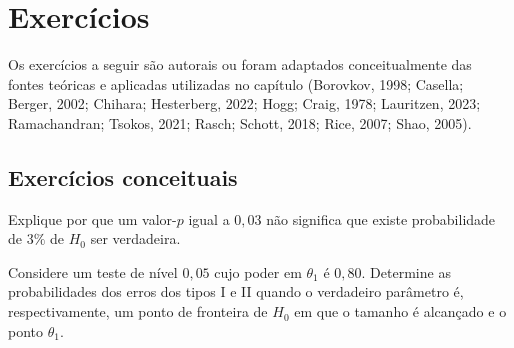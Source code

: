 \documentclass[
  letterpaper,
  DIV=11,
  numbers=noendperiod]{scrreprt}
\begin{document}
\section{Exercícios}\label{exercuxedcios-7}

Os exercícios a seguir são autorais ou foram adaptados conceitualmente
das fontes teóricas e aplicadas utilizadas no capítulo (Borovkov, 1998;
Casella; Berger, 2002; Chihara; Hesterberg, 2022; Hogg; Craig, 1978;
Lauritzen, 2023; Ramachandran; Tsokos, 2021; Rasch; Schott, 2018; Rice,
2007; Shao, 2005).

\subsection{Exercícios conceituais}\label{exercuxedcios-conceituais-1}

\begin{tcolorbox}[enhanced jigsaw, colback=white, leftrule=.75mm, colbacktitle=quarto-callout-note-color!10!white, breakable, titlerule=0mm, bottomtitle=1mm, title=\textcolor{quarto-callout-note-color}{\faInfo}\hspace{0.5em}{Exercício 1}, colframe=quarto-callout-note-color-frame, toprule=.15mm, opacityback=0, bottomrule=.15mm, opacitybacktitle=0.6, arc=.35mm, toptitle=1mm, rightrule=.15mm, coltitle=black, left=2mm]

Explique por que um valor-\(p\) igual a \(0{,}03\) não significa que
existe probabilidade de \(3\%\) de \(H_0\) ser verdadeira.

\end{tcolorbox}

\begin{tcolorbox}[enhanced jigsaw, colback=white, leftrule=.75mm, colbacktitle=quarto-callout-note-color!10!white, breakable, titlerule=0mm, bottomtitle=1mm, title=\textcolor{quarto-callout-note-color}{\faInfo}\hspace{0.5em}{Exercício 2}, colframe=quarto-callout-note-color-frame, toprule=.15mm, opacityback=0, bottomrule=.15mm, opacitybacktitle=0.6, arc=.35mm, toptitle=1mm, rightrule=.15mm, coltitle=black, left=2mm]

Considere um teste de nível \(0{,}05\) cujo poder em \(\theta_1\) é
\(0{,}80\). Determine as probabilidades dos erros dos tipos I e II
quando o verdadeiro parâmetro é, respectivamente, um ponto de fronteira
de \(H_0\) em que o tamanho é alcançado e o ponto \(\theta_1\).

\end{tcolorbox}
\end{document}
